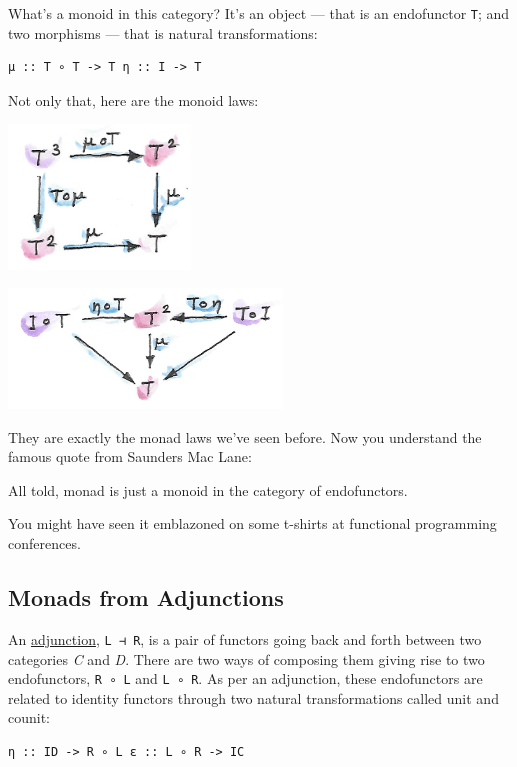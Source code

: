 What's a monoid in this category? It's an object --- that is an
endofunctor \texttt{T}; and two morphisms --- that is natural
transformations:

\begin{verbatim}
μ :: T ∘ T -> T η :: I -> T
\end{verbatim}

Not only that, here are the monoid laws:

\includegraphics[width=1.90625in]{images/assoc.png}

\includegraphics[width=2.86458in]{images/unitlawcomp.png}

They are exactly the monad laws we've seen before. Now you understand
the famous quote from Saunders Mac Lane:

All told, monad is just a monoid in the category of endofunctors.

You might have seen it emblazoned on some t-shirts at functional
programming conferences.

\subsection{Monads from Adjunctions}\label{monads-from-adjunctions}

An
\href{https://bartoszmilewski.com/2016/04/18/adjunctions/}{adjunction},
\texttt{L\ ⊣\ R}, is a pair of functors going back and forth between two
categories \emph{C} and \emph{D}. There are two ways of composing them
giving rise to two endofunctors, \texttt{R\ ∘\ L} and \texttt{L\ ∘\ R}.
As per an adjunction, these endofunctors are related to identity
functors through two natural transformations called unit and counit:

\begin{verbatim}
η :: ID -> R ∘ L ε :: L ∘ R -> IC
\end{verbatim}

